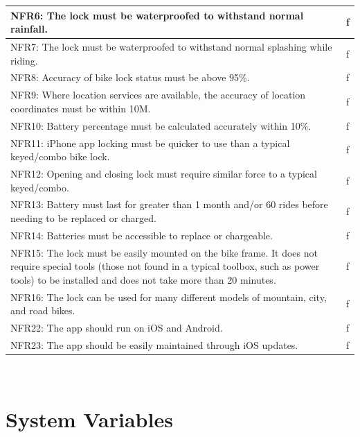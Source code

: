 \documentclass[12pt, titlepage]{article}
\begin{document}
\begin{minipage}{\textwidth}
\begin{tabular}{| p{} | p{} | }
 \hline
NFR6: The lock must be waterproofed to withstand normal rainfall.&f\\
 \hline
NFR7: The lock must be waterproofed to withstand normal splashing while riding. &f\\
 \hline
NFR8: Accuracy of bike lock status must be above 95\%.&f\\
 \hline
NFR9: Where location services are available, the accuracy of location coordinates must be within 10M. &f\\
 \hline
NFR10: Battery percentage must be calculated accurately within 10\%. &f\\
 \hline
NFR11: iPhone app locking must be quicker to use than a typical keyed/combo bike lock. &f\\
 \hline
NFR12: Opening and closing lock must require similar force to a typical keyed/combo. &f\\
 \hline
NFR13: Battery must last for greater than 1 month and/or 60 rides before needing to be replaced or charged. &f\\
 \hline
NFR14: Batteries must be accessible to replace or chargeable.&f\\
 \hline
NFR15: The lock must be easily mounted on the bike frame. It does not require special tools (those not found in a typical toolbox, such as power tools) to be installed and does not take more than 20 minutes. &f\\
 \hline
NFR16: The lock can be used for many different models of mountain, city, and road bikes. &f\\
 \hline
NFR22: The app should run on iOS and Android.&f\\
 \hline
NFR23: The app should be easily maintained through iOS updates.&f\\
 \hline


\end{tabular}
\end{minipage}\\



\newpage
\section{System Variables}
\end{document}
